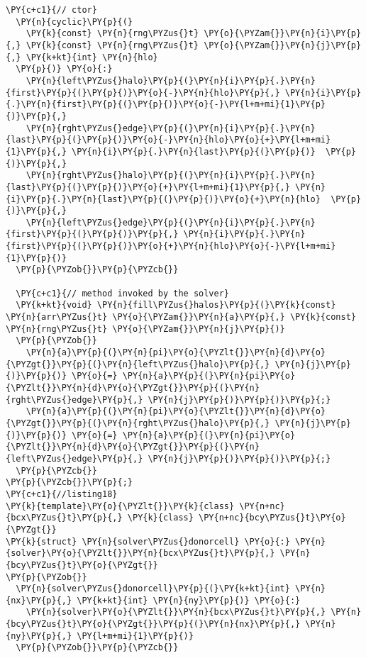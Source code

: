 \begin{Verbatim}[commandchars=\\\{\}]
  \PY{c+c1}{// ctor}
  \PY{n}{cyclic}\PY{p}{(}
    \PY{k}{const} \PY{n}{rng\PYZus{}t} \PY{o}{\PYZam{}}\PY{n}{i}\PY{p}{,} \PY{k}{const} \PY{n}{rng\PYZus{}t} \PY{o}{\PYZam{}}\PY{n}{j}\PY{p}{,} \PY{k+kt}{int} \PY{n}{hlo}
  \PY{p}{)} \PY{o}{:}
    \PY{n}{left\PYZus{}halo}\PY{p}{(}\PY{n}{i}\PY{p}{.}\PY{n}{first}\PY{p}{(}\PY{p}{)}\PY{o}{-}\PY{n}{hlo}\PY{p}{,} \PY{n}{i}\PY{p}{.}\PY{n}{first}\PY{p}{(}\PY{p}{)}\PY{o}{-}\PY{l+m+mi}{1}\PY{p}{)}\PY{p}{,}
    \PY{n}{rght\PYZus{}edge}\PY{p}{(}\PY{n}{i}\PY{p}{.}\PY{n}{last}\PY{p}{(}\PY{p}{)}\PY{o}{-}\PY{n}{hlo}\PY{o}{+}\PY{l+m+mi}{1}\PY{p}{,} \PY{n}{i}\PY{p}{.}\PY{n}{last}\PY{p}{(}\PY{p}{)}  \PY{p}{)}\PY{p}{,}
    \PY{n}{rght\PYZus{}halo}\PY{p}{(}\PY{n}{i}\PY{p}{.}\PY{n}{last}\PY{p}{(}\PY{p}{)}\PY{o}{+}\PY{l+m+mi}{1}\PY{p}{,} \PY{n}{i}\PY{p}{.}\PY{n}{last}\PY{p}{(}\PY{p}{)}\PY{o}{+}\PY{n}{hlo}  \PY{p}{)}\PY{p}{,}
    \PY{n}{left\PYZus{}edge}\PY{p}{(}\PY{n}{i}\PY{p}{.}\PY{n}{first}\PY{p}{(}\PY{p}{)}\PY{p}{,} \PY{n}{i}\PY{p}{.}\PY{n}{first}\PY{p}{(}\PY{p}{)}\PY{o}{+}\PY{n}{hlo}\PY{o}{-}\PY{l+m+mi}{1}\PY{p}{)}
  \PY{p}{\PYZob{}}\PY{p}{\PYZcb{}} 

  \PY{c+c1}{// method invoked by the solver}
  \PY{k+kt}{void} \PY{n}{fill\PYZus{}halos}\PY{p}{(}\PY{k}{const} \PY{n}{arr\PYZus{}t} \PY{o}{\PYZam{}}\PY{n}{a}\PY{p}{,} \PY{k}{const} \PY{n}{rng\PYZus{}t} \PY{o}{\PYZam{}}\PY{n}{j}\PY{p}{)}
  \PY{p}{\PYZob{}}
    \PY{n}{a}\PY{p}{(}\PY{n}{pi}\PY{o}{\PYZlt{}}\PY{n}{d}\PY{o}{\PYZgt{}}\PY{p}{(}\PY{n}{left\PYZus{}halo}\PY{p}{,} \PY{n}{j}\PY{p}{)}\PY{p}{)} \PY{o}{=} \PY{n}{a}\PY{p}{(}\PY{n}{pi}\PY{o}{\PYZlt{}}\PY{n}{d}\PY{o}{\PYZgt{}}\PY{p}{(}\PY{n}{rght\PYZus{}edge}\PY{p}{,} \PY{n}{j}\PY{p}{)}\PY{p}{)}\PY{p}{;}     
    \PY{n}{a}\PY{p}{(}\PY{n}{pi}\PY{o}{\PYZlt{}}\PY{n}{d}\PY{o}{\PYZgt{}}\PY{p}{(}\PY{n}{rght\PYZus{}halo}\PY{p}{,} \PY{n}{j}\PY{p}{)}\PY{p}{)} \PY{o}{=} \PY{n}{a}\PY{p}{(}\PY{n}{pi}\PY{o}{\PYZlt{}}\PY{n}{d}\PY{o}{\PYZgt{}}\PY{p}{(}\PY{n}{left\PYZus{}edge}\PY{p}{,} \PY{n}{j}\PY{p}{)}\PY{p}{)}\PY{p}{;}     
  \PY{p}{\PYZcb{}}
\PY{p}{\PYZcb{}}\PY{p}{;}
\PY{c+c1}{//listing18}
\PY{k}{template}\PY{o}{\PYZlt{}}\PY{k}{class} \PY{n+nc}{bcx\PYZus{}t}\PY{p}{,} \PY{k}{class} \PY{n+nc}{bcy\PYZus{}t}\PY{o}{\PYZgt{}}
\PY{k}{struct} \PY{n}{solver\PYZus{}donorcell} \PY{o}{:} \PY{n}{solver}\PY{o}{\PYZlt{}}\PY{n}{bcx\PYZus{}t}\PY{p}{,} \PY{n}{bcy\PYZus{}t}\PY{o}{\PYZgt{}} 
\PY{p}{\PYZob{}}
  \PY{n}{solver\PYZus{}donorcell}\PY{p}{(}\PY{k+kt}{int} \PY{n}{nx}\PY{p}{,} \PY{k+kt}{int} \PY{n}{ny}\PY{p}{)} \PY{o}{:}
    \PY{n}{solver}\PY{o}{\PYZlt{}}\PY{n}{bcx\PYZus{}t}\PY{p}{,} \PY{n}{bcy\PYZus{}t}\PY{o}{\PYZgt{}}\PY{p}{(}\PY{n}{nx}\PY{p}{,} \PY{n}{ny}\PY{p}{,} \PY{l+m+mi}{1}\PY{p}{)}
  \PY{p}{\PYZob{}}\PY{p}{\PYZcb{}}  


\end{Verbatim}
